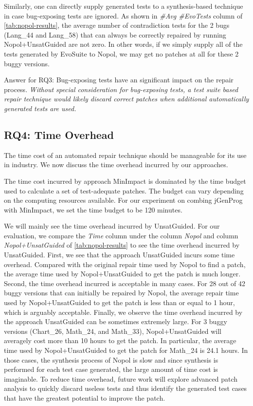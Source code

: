 \documentclass[]{sig-alternate}
\begin{document}
Similarly, one can directly supply generated tests to a synthesis-based technique in case bug-exposing tests are ignored. As shown in \emph{\#Avg \#EvoTests} column of \autoref{tab:nopol-results}, the average number of contradiction tests for the 2 bugs (Lang\_44 and Lang\_58) that can always be correctly repaired by running Nopol+UnsatGuided are not zero. In other words, if we simply supply all of the tests generated by EvoSuite to Nopol, we may get no patches at all for these 2 buggy versions. 


Answer for RQ3: Bug-exposing tests have an significant impact on the repair process. 
\emph{Without special consideration for bug-exposing tests, a test suite based repair technique would likely discard correct patches when additional automatically generated tests are used.}

\vspace{-0.5em}
\subsection{RQ4: Time Overhead}

The time cost of an automated repair technique should be manageable for its use in industry. We now discuss the time overhead incurred by our approaches. 

The time cost incurred by approach MinImpact is dominated by the time budget used to calculate a set of test-adequate patches. The budget can vary depending on the computing resources available. For our experiment on combing jGenProg with MinImpact, we set the time budget to be 120 minutes. 

We will mainly see the time overhead incurred by UnsatGuided. For our evaluation, we compare the \emph{Time} column under the column \emph{Nopol} and column \emph{Nopol+UnsatGuided} of \autoref{tab:nopol-results} to see the time overhead incurred by UnsatGuided. First, we see that the approach UnsatGuided incurs some time overhead. Compared with the original repair time used by Nopol to find a patch, the average time used by Nopol+UnsatGuided to get the patch is much longer. Second, the time overhead incurred is acceptable in many cases. For 28 out of 42 buggy versions that can initially be repaired by Nopol, the average repair time used by Nopol+UnsatGuided to get the patch is less than or equal to 1 hour, which is arguably acceptable. Finally, we observe the time overhead incurred by the approach UnsatGuided can be sometimes extremely large. For 3 buggy versions (Chart\_26, Math\_24, and Math\_33), Nopol+UnsatGuided will averagely cost more than 10 hours to get the patch. In particular, the average time used by Nopol+UnsatGuided to get the patch for Math\_24 is 24.1 hours. In those cases, the synthesis process of Nopol is slow and since synthesis is performed for each test case generated, the large amount of time cost is imaginable. To reduce time overhead, future work will explore advanced patch analysis to quickly discard useless tests and thus identify the generated test cases that have the greatest potential to improve the patch.
\end{document}
